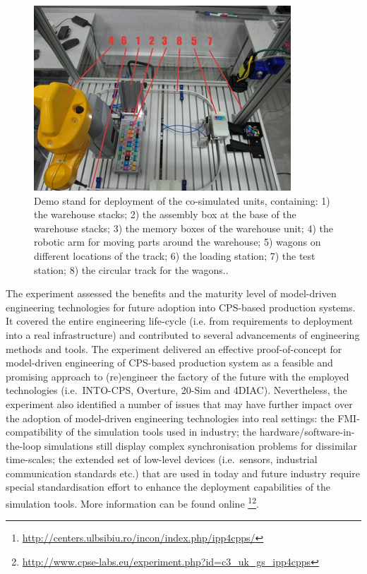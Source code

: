 \begin{figure}[!ht]
	\centering
		\includegraphics[width=0.9 \textwidth]{./figures/demo_stand}
	\caption{Demo stand for deployment of the co-simulated units, containing: 1) the warehouse stacks; 2) the assembly box at the base of the warehouse stacks; 3) the memory boxes of the warehouse unit; 4) the robotic arm for moving parts around the warehouse; 5) wagons on different locations of the track; 6) the loading station; 7) the test station; 8) the circular track for the wagons..}
	\label{fig:demo_stand}
\end{figure}

The experiment assessed the benefits and the maturity level of model-driven engineering technologies for future adoption into CPS-based production systems. It covered the entire engineering life-cycle (i.e. from requirements to deployment into a real infrastructure) and contributed to several advancements of engineering methods and tools. The experiment delivered an effective proof-of-concept for model-driven engineering of CPS-based production system as a feasible and promising approach to (re)engineer the factory of the future with the employed technologies (i.e.\ INTO-CPS, Overture, 20-Sim and 4DIAC). Nevertheless, the experiment also identified a number of issues that may have further impact over the adoption of model-driven engineering technologies into real settings: the FMI-compatibility of the simulation tools used in industry; the hardware/software-in-the-loop simulations still display complex synchronisation problems for dissimilar time-scales; the extended set of low-level devices (i.e.\ sensors, industrial communication standards etc.) that are used in today and future industry require special standardisation effort to enhance the deployment capabilities of the simulation tools.
More information can be found online 
\footnote{\url{http://centers.ulbsibiu.ro/incon/index.php/ipp4cpps/}}\footnote{\url{http://www.cpse-labs.eu/experiment.php?id=c3\_uk\_gs\_ipp4cpps}}.

